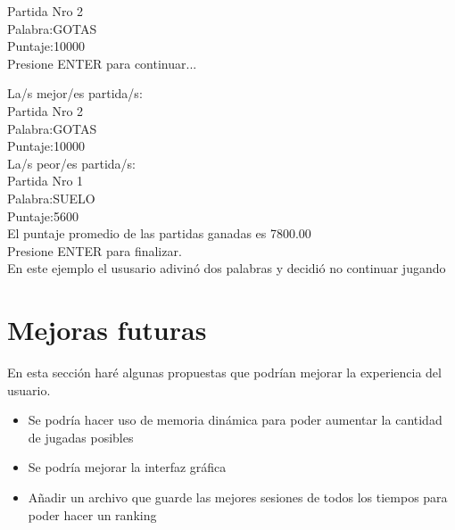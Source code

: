 \documentclass[oneside]{article}
\begin{document}
	Partida Nro 2\\
	Palabra:GOTAS\\
	Puntaje:10000\\


	Presione ENTER para continuar...

	\newpage
	\thispagestyle{fancy}
	
	La/s mejor/es partida/s:\\
	Partida Nro 2\\
	Palabra:GOTAS\\
	Puntaje:10000\\

	La/s peor/es partida/s:\\
	Partida Nro 1\\
	Palabra:SUELO\\
	Puntaje:5600\\

	El puntaje promedio de las partidas ganadas es 7800.00\\
	Presione ENTER para finalizar.\\
	
	En este ejemplo el ususario adivinó dos palabras y decidió no continuar jugando
	
	\newpage
	\thispagestyle{fancy}
	
	\section*{Mejoras futuras}
	En esta sección haré algunas propuestas que podrían mejorar la experiencia del usuario.
	\begin{itemize}
	\item Se podría hacer uso de memoria dinámica para poder aumentar la cantidad de jugadas posibles
	\item Se podría mejorar la interfaz gráfica
	\item Añadir un archivo que guarde las mejores sesiones de todos los tiempos para poder hacer un ranking
	\end{itemize}
	
	\newpage
	\thispagestyle{fancy}
	
\end{document}

